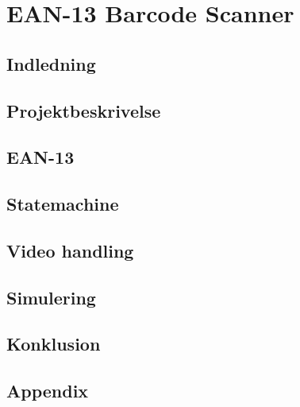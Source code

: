 
\raggedbottom


\chapter*{EAN-13 Barcode Scanner}

\section*{Indledning}

\section*{Projektbeskrivelse}

\section*{EAN-13}

\section*{Statemachine}

\section*{Video handling}

\section*{Simulering}

\section*{Konklusion}

\section*{Appendix}




